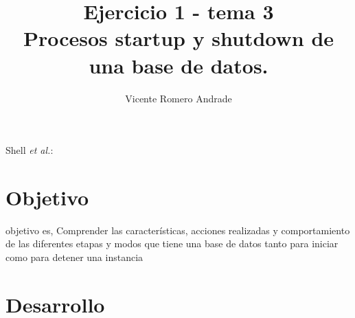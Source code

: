 \documentclass[journal]{IEEEtran}
\begin{document}
\title{Ejercicio 1 - tema 3 \\ Procesos startup y shutdown de una base de datos.}
%
\author{Vicente Romero Andrade}

%
{Shell \MakeLowercase{\textit{et al.}}: }

\maketitle


\IEEEpeerreviewmaketitle

\section{Objetivo}

 objetivo es, Comprender las características, acciones realizadas y 
comportamiento de las diferentes etapas y modos que tiene una base de datos tanto para iniciar como para detener una instancia

\section{Desarrollo}
\end{document}
